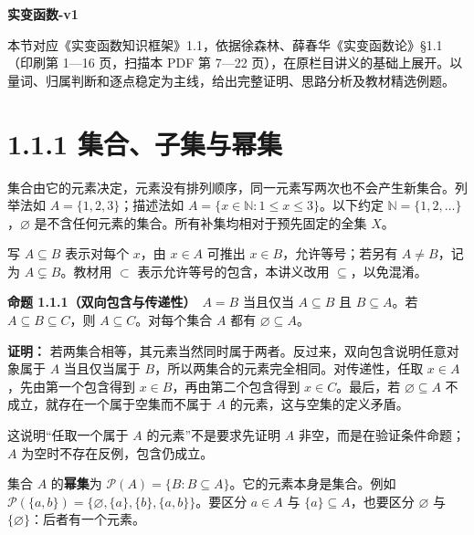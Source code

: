 \documentclass[11pt,a4paper]{article}
\begin{document}
\begin{center}
{\Large\bfseries 实变函数-v1\par}
\vspace{7pt}{\large 1.1 集合及其运算\par}
\vspace{5pt}{第一章 集合与点集\par}
\end{center}
本节对应《实变函数知识框架》1.1，依据徐森林、薛春华《实变函数论》\S1.1（印刷第 1—16 页，扫描本 PDF 第 7—22 页），在原栏目讲义的基础上展开。以量词、归属判断和逐点稳定为主线，给出完整证明、思路分析及教材精选例题。
\begingroup\setlength{\parskip}{0pt}\tableofcontents\endgroup

\section[\S{}1.1.1
集合、子集与幂集]{1.1.1
集合、子集与幂集}\label{ux96c6ux5408ux5b50ux96c6ux4e0eux5e42ux96c6}

集合由它的元素决定，元素没有排列顺序，同一元素写两次也不会产生新集合。列举法如
\(A=\{1,2,3\}\)；描述法如 \(A=\{x\in\mathbb N:1\le x\le3\}\)。以下约定
\(\mathbb N=\{1,2,\ldots\}\)，\(\varnothing\)
是不含任何元素的集合。所有补集均相对于预先固定的全集 \(X\)。

写 \(A\subseteq B\) 表示对每个 \(x\)，由 \(x\in A\) 可推出
\(x\in B\)，允许等号；若另有 \(A\ne B\)，记为 \(A\subsetneq B\)。教材用
\(\subset\) 表示允许等号的包含，本讲义改用 \(\subseteq\)，以免混淆。

\textbf{命题 1.1.1（双向包含与传递性）}　\(A=B\) 当且仅当
\(A\subseteq B\) 且 \(B\subseteq A\)。若 \(A\subseteq B\subseteq C\)，则
\(A\subseteq C\)。对每个集合 \(A\) 都有 \(\varnothing\subseteq A\)。

\textbf{证明：}
若两集合相等，其元素当然同时属于两者。反过来，双向包含说明任意对象属于
\(A\) 当且仅当属于 \(B\)，所以两集合的元素完全相同。对传递性，任取
\(x\in A\)，先由第一个包含得到 \(x\in B\)，再由第二个包含得到
\(x\in C\)。最后，若 \(\varnothing\subseteq A\)
不成立，就存在一个属于空集而不属于 \(A\) 的元素，这与空集的定义矛盾。

这说明``任取一个属于 \(A\) 的元素''不是要求先证明 \(A\)
非空，而是在验证条件命题；\(A\) 为空时不存在反例，包含仍成立。

集合 \(A\) 的\textbf{幂集}为
\(\mathcal P(A)=\{B:B\subseteq A\}\)。它的元素本身是集合。例如
\(\mathcal P(\{a,b\})=\{\varnothing,\{a\},\{b\},\{a,b\}\}\)。要区分
\(a\in A\) 与 \(\{a\}\subseteq A\)，也要区分 \(\varnothing\) 与
\(\{\varnothing\}\)：后者有一个元素。
\end{document}
